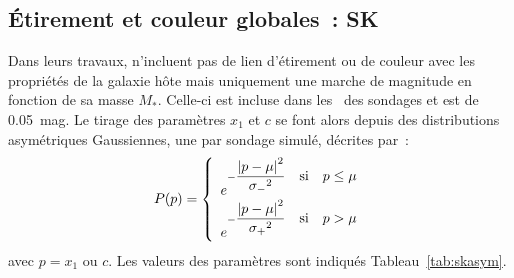 \documentclass[../main/main.tex]{subfiles}
\begin{document}
\subsection{Étirement et couleur globales~: SK}\label{ssec:sk}

Dans leurs travaux,  n'incluent pas de lien d'étirement
ou de couleur avec les propriétés de la galaxie hôte mais uniquement une marche
de magnitude en fonction de sa masse $M_*$. Celle-ci est incluse dans les
\wgtmap\ des sondages et est de \SI{0.05}{mag}. Le tirage des paramètres $x_1$
et $c$ se font alors depuis des distributions asymétriques Gaussiennes, une par
sondage simulé, décrites par~:
\begin{equation}\label{eq:skasym}
    P(p) = \left\{
        \begin{array}{l}
            e^{-\displaystyle\frac{\abs{p-\mu}^2}{\sigma_-{}^2}
                \quad\text{si}\quad p\leq\mu} \\
            e^{-\displaystyle\frac{\abs{p-\mu}^2}{\sigma_+{}^2}
                \quad\text{si}\quad p>\mu} \\
        \end{array}
        \right.
\end{equation}
avec $p = x_1$ ou $c$. Les valeurs des paramètres sont indiqués
Tableau~\ref{tab:skasym}.
\end{document}
